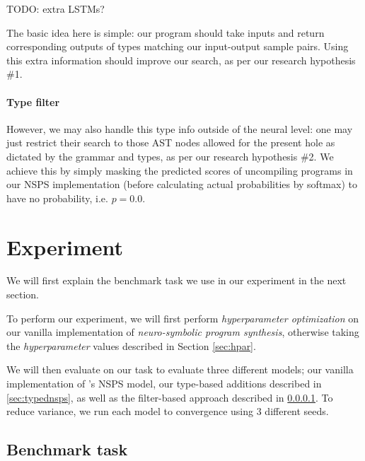 \documentclass{article}
\begin{document}
TODO: extra LSTMs?

The basic idea here is simple: our program should take inputs and return
corresponding outputs of types matching our input-output sample pairs.
Using this extra information should improve our search,
as per our research hypothesis \#1.

\paragraph{Type filter} \label{sec:filter}

However, we may also handle this type info outside of the neural level:
one may just restrict their search to those AST nodes allowed
for the present hole as dictated by the grammar and types,
as per our research hypothesis \#2.
We achieve this by simply masking the predicted scores of uncompiling programs in our NSPS implementation
(before calculating actual probabilities by softmax) to have no probability, i.e. $p=0.0$.


\section{Experiment} \label{sec:experiment}

We will first explain the benchmark task we use in our experiment in
the next section.

To perform our experiment, we will
first perform \emph{hyperparameter optimization} on our vanilla implementation of \emph{neuro-symbolic program synthesis},
otherwise taking the \emph{hyperparameter} values described in Section \ref{sec:hpar}.

We will then evaluate on our task to evaluate three different models;
our vanilla implementation of \citet{nsps}'s NSPS model,
our type-based additions described in \ref{sec:typednsps},
as well as the filter-based approach described in \ref{sec:filter}.
To reduce variance, we run each model to convergence using $3$ different seeds.

\subsection{Benchmark task} \label{sec:task}
\end{document}
